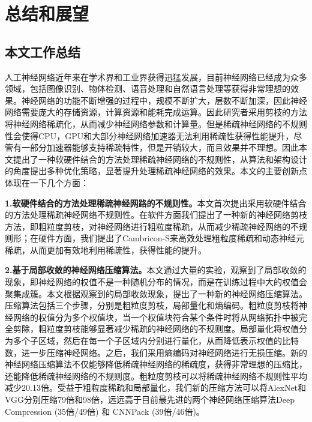 \chapter{总结和展望}

\section{本文工作总结}
人工神经网络近年来在学术界和工业界获得迅猛发展，目前神经网络已经成为众多领域，包括图像识别、物体检测、语音处理和自然语言处理等获得非常理想的效果。神经网络的功能不断增强的过程中，规模不断扩大，层数不断加深，因此神经网络需要庞大的存储资源，计算资源和能耗完成运算。因此研究者采用剪枝的方法将神经网络稀疏化，从而减少神经网络参数和计算量。但是稀疏神经网络的不规则性会使得CPU，GPU和大部分神经网络加速器无法利用稀疏性获得性能提升，尽管有一部分加速器能够支持稀疏特性，但是开销较大，而且效果并不理想。因此本文提出了一种软硬件结合的方法处理稀疏神经网络的不规则性，从算法和架构设计的角度提出多种优化策略，显著提升处理稀疏神经网络的效果。本文的主要创新点体现在一下几个方面：

\textbf{1.软硬件结合的方法处理稀疏神经网路的不规则性。}本文首次提出采用软硬件结合的方法处理稀疏神经网络不规则性。在软件方面我们提出了一种新的神经网络剪枝方法，即粗粒度剪枝，对神经网络进行粗粒度稀疏，从而减少稀疏神经网络的不规则形；在硬件方面，我们提出了Cambricon-S来高效处理粗粒度稀疏和动态神经元稀疏，从而更加有效地利用稀疏性，获得性能的提升。

\textbf{2.基于局部收敛的神经网络压缩算法。}本文通过大量的实验，观察到了局部收敛的现象，即神经网络的权值不是一种随机分布的情况，而是在训练过程中大的权值会聚集成簇。本文根据观察到的局部收敛现象，提出了一种新的神经网络压缩算法。压缩算法包括三个步骤，分别是粗粒度剪枝，局部量化和熵编码。粗粒度剪枝将神经网络的权值分为多个权值块，当一个权值块符合某个条件时将从网络拓扑中被完全剪除，粗粒度剪枝能够显著减少稀疏的神经网络的不规则度。局部量化将权值分为多个子区域，然后在每一个子区域内分别进行量化，从而降低表示权值的比特数，进一步压缩神经网络。之后，我们采用熵编码对神经网络进行无损压缩。新的神经网络压缩算法不仅能够降低稀疏神经网络的稀疏度，获得非常理想的压缩比，还能降低稀疏神经网络的不规则度。粗粒度剪枝可以将稀疏神经网络不规则性平均减少20.13倍。受益于粗粒度稀疏和局部量化，我们新的压缩方法可以将AlexNet和VGG分别压缩79倍和98倍，远远高于目前最先进的两个神经网络压缩算法Deep Compression (35倍/49倍) 和 CNNPack (39倍/46倍)。

